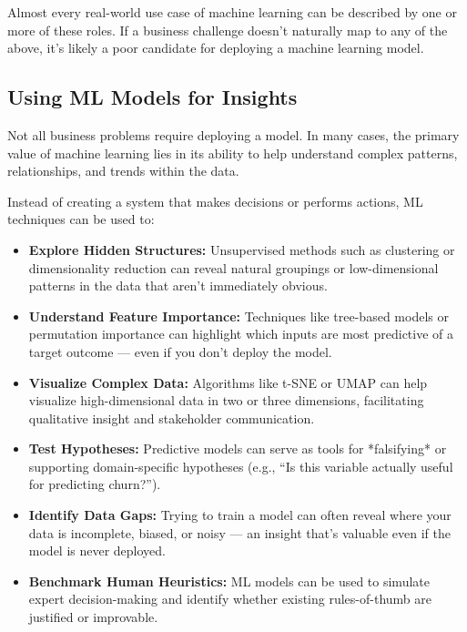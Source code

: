 \documentclass[12pt,openany]{book}
\begin{document}
Almost every real-world use case of machine learning can be described by one or more of these roles. If a business challenge doesn’t naturally map to any of the above, it’s likely a poor candidate for deploying a machine learning model.


\subsection{Using ML Models for Insights}

Not all business problems require deploying a model. In many cases, the primary value of machine learning lies in its ability to help understand complex patterns, relationships, and trends within the data. \newline

Instead of creating a system that makes decisions or performs actions, ML techniques can be used to:

\begin{itemize}
    \item \textbf{Explore Hidden Structures:} Unsupervised methods such as clustering or dimensionality reduction can reveal natural groupings or low-dimensional patterns in the data that aren’t immediately obvious.
    
    \item \textbf{Understand Feature Importance:} Techniques like tree-based models or permutation importance can highlight which inputs are most predictive of a target outcome — even if you don’t deploy the model.
    
    \item \textbf{Visualize Complex Data:} Algorithms like t-SNE or UMAP can help visualize high-dimensional data in two or three dimensions, facilitating qualitative insight and stakeholder communication.
    
    \item \textbf{Test Hypotheses:} Predictive models can serve as tools for *falsifying* or supporting domain-specific hypotheses (e.g., “Is this variable actually useful for predicting churn?”).
    
    \item \textbf{Identify Data Gaps:} Trying to train a model can often reveal where your data is incomplete, biased, or noisy — an insight that’s valuable even if the model is never deployed.
    
    \item \textbf{Benchmark Human Heuristics:} ML models can be used to simulate expert decision-making and identify whether existing rules-of-thumb are justified or improvable.
\end{itemize}
\end{document}
